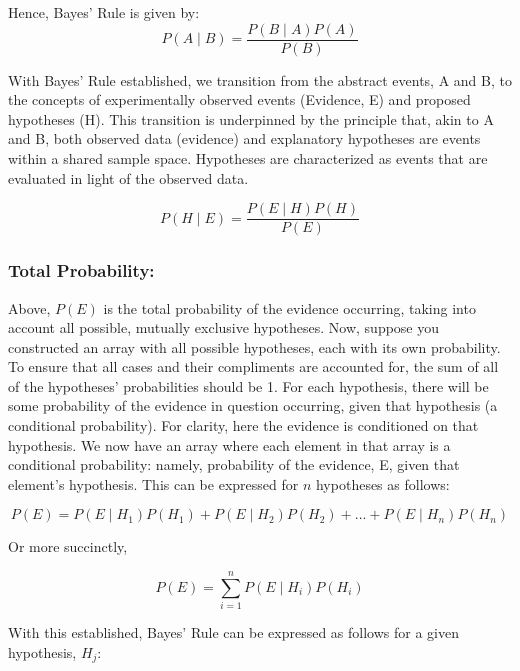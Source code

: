 \documentclass[12pt]{article}
\begin{document}
\noindent Hence, Bayes' Rule is given by:
\begin{equation}
P(A \mid B) = \frac{P(B \mid A) P(A)}{P(B)}
\end{equation}

\noindent With Bayes' Rule established, we transition from the abstract events, A and B, to the concepts of experimentally observed events (Evidence, E) and proposed hypotheses (H). This transition is underpinned by the principle that, akin to A and B, both observed data (evidence) and explanatory hypotheses are events within a shared sample space. Hypotheses are characterized as events that are evaluated in light of the observed data.

\begin{equation}
P(H \mid E) = \frac{P(E \mid H) P(H)}{P(E)}
\end{equation}

\newpage

\subsubsection*{Total Probability:}
\noindent Above, $P(E)$ is the total probability of the evidence occurring, taking into account all possible, mutually exclusive hypotheses. Now, suppose you constructed an array with all possible hypotheses, each with its own probability. To ensure that all cases and their compliments are accounted for, the sum of all of the hypotheses' probabilities should be 1. For each hypothesis, there will be some probability of the evidence in question occurring, given that hypothesis (a conditional probability). For clarity, here the evidence is conditioned on that hypothesis. We now have an array where each element in that array is a conditional probability: namely, probability of the evidence, E, given that element's hypothesis. This can be expressed for $n$ hypotheses as follows:

\begin{equation}
P(E) = P(E \mid H_1) P(H_1) + P(E \mid H_2) P(H_2) + ... + P(E \mid H_n) P(H_n)
\end{equation}

\noindent Or more succinctly, 

\begin{equation}
P(E) = \sum_{i=1}^{n} P(E \mid H_i) P(H_i)
\end{equation}

\noindent With this established, Bayes' Rule can be expressed as follows for a given hypothesis, $H_j$: 
\end{document}
